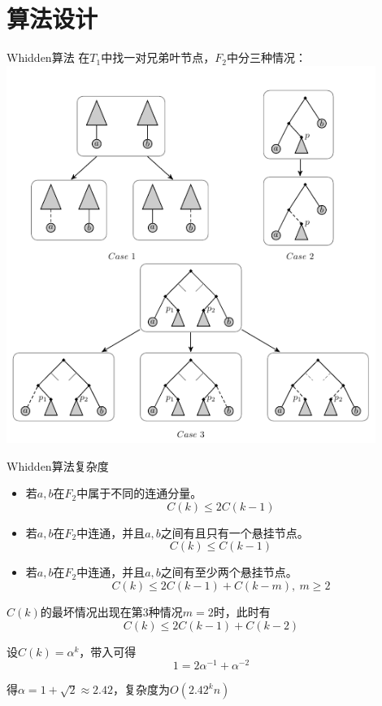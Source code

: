 \documentclass[slidestop,compress,mathserif,red]{beamer}
\begin{document}
\section{算法设计}
\begin{frame}{Whidden算法}
  在$T_1$中找一对兄弟叶节点，$F_2$中分三种情况：\\
    \includegraphics[width=0.9\textwidth, height=0.8\textheight, keepaspectratio]{./pic/3cases.pdf}
\end{frame}

\begin{frame}{Whidden算法复杂度}
\begin{itemize}
  \item 若$a,b$在$F_2$中属于不同的连通分量。
  \begin{equation*}
    C(k) \le 2C(k-1)
  \end{equation*}
  \item 若$a,b$在$F_2$中连通，并且$a,b$之间有且只有一个悬挂节点。
  \begin{equation*}
    C(k) \le C(k-1)
  \end{equation*}
  \item 若$a,b$在$F_2$中连通，并且$a,b$之间有至少两个悬挂节点。
  \begin{equation*}
    C(k) \le 2C(k-1) + C(k-m),~m \ge 2
  \end{equation*}
\end{itemize}
$C(k)$的最坏情况出现在第3种情况$m = 2$时，此时有
\begin{equation*}
C(k) \le 2C(k-1) + C(k-2)
\end{equation*}

设$C(k)=\alpha ^ k$，带入可得
\begin{equation*}
 1 = 2 \alpha ^ {-1} + \alpha ^ {-2}
\end{equation*}

得$\alpha = 1 + \sqrt{2} \approx 2.42$，复杂度为$O(2.42^kn)$
\end{frame}
\end{document}
